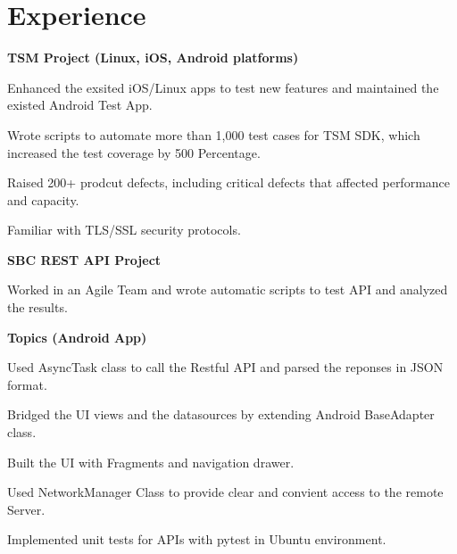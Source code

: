\documentclass[a4paper]{lyu-resume} %
\begin{document}
\begin{minipage}[t]{0.66\textwidth} %

\section{Experience}


\textbf{TSM Project (Linux, iOS, Android platforms)}
\vspace{\topsep} %
\begin{tightitemize}
\item Enhanced the exsited iOS/Linux apps to test new features and maintained the existed Android Test App.
\item Wrote scripts to automate more than 1,000 test cases for TSM SDK, which increased the test coverage by 500 Percentage. 
\item Raised 200+ prodcut defects, including critical defects that affected performance and capacity.
\item Familiar with TLS/SSL security protocols. 
\end{tightitemize}

\vspace{\topsep} %
\textbf{SBC REST API Project}
\begin{tightitemize}
\item Worked in an Agile Team and wrote automatic scripts to test API and analyzed the results.
\end{tightitemize}
\sectionspace %



\textbf{Topics (Android App)}
\begin{tightitemize}
\item Used AsyncTask class to call the Restful API and parsed the reponses in JSON format.
\item Bridged the UI views and the datasources by extending Android BaseAdapter class.
\item Built the UI with Fragments and navigation drawer.
\item Used NetworkManager Class to provide clear and convient access to the remote Server.
\item Implemented unit tests for APIs with pytest in Ubuntu environment. 
\end{tightitemize}


\end{minipage}
\end{document}
